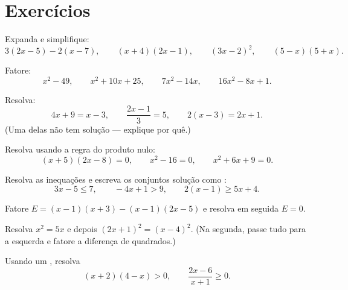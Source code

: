 \section{Exercícios}

\begin{exercise}[$\star$]\label{exo:g10:algebra:1}
Expanda e simplifique:
\[
3(2x - 5) - 2(x - 7), \qquad
(x + 4)(2x - 1), \qquad
(3x - 2)^2, \qquad
(5 - x)(5 + x).
\]
\end{exercise}

\begin{exercise}[$\star$]\label{exo:g10:algebra:2}
Fatore:
\[
x^2 - 49, \qquad
x^2 + 10x + 25, \qquad
7x^2 - 14x, \qquad
16x^2 - 8x + 1 .
\]
\end{exercise}

\begin{exercise}[$\star$]\label{exo:g10:algebra:3}
Resolva:
\[
4x + 9 = x - 3, \qquad
\frac{2x - 1}{3} = 5, \qquad
2(x - 3) = 2x + 1 .
\]
(Uma delas não tem solução --- explique por quê.)
\end{exercise}

\begin{exercise}[$\star$]\label{exo:g10:algebra:4}
Resolva usando a regra do produto nulo:
\[
(x + 5)(2x - 8) = 0, \qquad
x^2 - 16 = 0, \qquad
x^2 + 6x + 9 = 0 .
\]
\end{exercise}

\begin{exercise}[$\star$]\label{exo:g10:algebra:5}
Resolva as inequações e escreva os conjuntos solução como :
\[
3x - 5 \leq 7, \qquad
-4x + 1 > 9, \qquad
2(x - 1) \geq 5x + 4 .
\]
\end{exercise}

\begin{exercise}[$\star\star$]\label{exo:g10:algebra:6}
Fatore $E = (x - 1)(x + 3) - (x - 1)(2x - 5)$ e resolva em seguida
$E = 0$.
\end{exercise}

\begin{exercise}[$\star\star$]\label{exo:g10:algebra:7}
Resolva $x^2 = 5x$ e depois $(2x + 1)^2 = (x - 4)^2$. (Na segunda, passe
tudo para a esquerda e fatore a diferença de quadrados.)
\end{exercise}

\begin{exercise}[$\star\star$]\label{exo:g10:algebra:8}
Usando um , resolva
\[
(x + 2)(4 - x) > 0,
\qquad
\frac{2x - 6}{x + 1} \geq 0 .
\]
\end{exercise}

